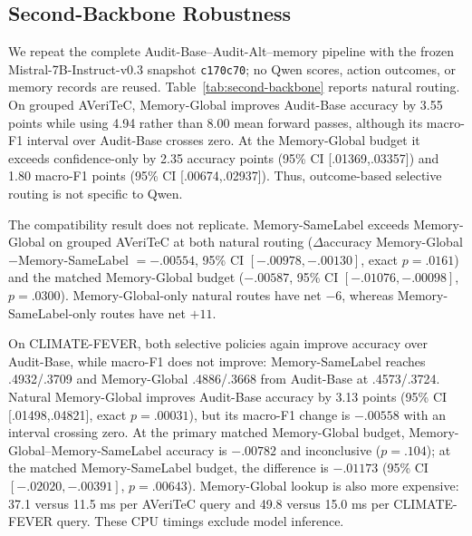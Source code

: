\documentclass[runningheads]{llncs}
\begin{document}
\subsection{Second-Backbone Robustness}

We repeat the complete Audit-Base--Audit-Alt--memory pipeline with the frozen
Mistral-7B-Instruct-v0.3 snapshot \texttt{c170c70}; no Qwen scores, action
outcomes, or memory records are reused. Table~\ref{tab:second-backbone}
reports natural routing. On grouped AVeriTeC, Memory-Global improves Audit-Base accuracy by
3.55 points while using 4.94 rather than 8.00 mean forward passes, although
its macro-F1 interval over Audit-Base crosses zero. At the Memory-Global budget it exceeds
confidence-only by 2.35 accuracy points (95\% CI [.01369,.03357]) and 1.80
macro-F1 points (95\% CI [.00674,.02937]). Thus, outcome-based selective
routing is not specific to Qwen.

The compatibility result does not replicate. Memory-SameLabel exceeds Memory-Global on grouped
AVeriTeC at both natural routing ($\Delta$accuracy Memory-Global$-$Memory-SameLabel $=-.00554$,
95\% CI $[-.00978,-.00130]$, exact $p=.0161$) and the matched Memory-Global budget
($-.00587$, 95\% CI $[-.01076,-.00098]$, $p=.0300$). Memory-Global-only natural routes
have net $-6$, whereas Memory-SameLabel-only routes have net $+11$.

On CLIMATE-FEVER, both selective policies again improve accuracy over Audit-Base,
while macro-F1 does not improve: Memory-SameLabel reaches .4932/.3709 and Memory-Global
.4886/.3668 from Audit-Base at .4573/.3724. Natural Memory-Global improves Audit-Base accuracy by
3.13 points (95\% CI [.01498,.04821], exact $p=.00031$), but its macro-F1
change is $-.00558$ with an interval crossing zero. At the primary matched
Memory-Global budget, Memory-Global--Memory-SameLabel accuracy is $-.00782$ and inconclusive
($p=.104$); at the matched Memory-SameLabel budget, the difference is $-.01173$
(95\% CI $[-.02020,-.00391]$, $p=.00643$). Memory-Global lookup is also more expensive:
37.1 versus 11.5 ms per AVeriTeC query and 49.8 versus 15.0 ms per
CLIMATE-FEVER query. These CPU timings exclude model inference.
\end{document}
